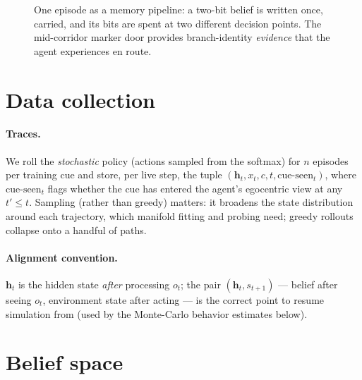 \documentclass[11pt]{article}
\newcommand{\h}{\bm{h}}
\begin{document}
\begin{figure}[h]
\centering
{}
\caption{One episode as a memory pipeline: a two-bit belief is written once,
carried, and its bits are spent at two different decision points. The
mid-corridor marker door provides branch-identity \emph{evidence} that the
agent experiences en route.}
\end{figure}

\section{Data collection}

\paragraph{Traces.} We roll the \emph{stochastic} policy (actions sampled from
the softmax) for $n$ episodes per training cue and store, per live step, the
tuple $(\h_t, x_t, c, t, \text{cue-seen}_t)$, where
$\text{cue-seen}_t$ flags whether the cue has entered the agent's egocentric
view at any $t' \le t$. Sampling (rather than greedy) matters: it broadens the
state distribution around each trajectory, which manifold fitting and probing
need; greedy rollouts collapse onto a handful of paths.

\paragraph{Alignment convention.} $\h_t$ is the hidden state \emph{after}
processing $o_t$; the pair $(\h_t, s_{t+1})$ --- belief after seeing $o_t$,
environment state after acting --- is the correct point to resume simulation
from (used by the Monte-Carlo behavior estimates below).

\section{Belief space}
\end{document}

